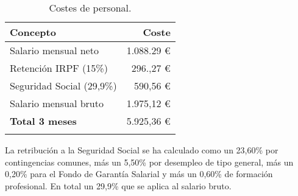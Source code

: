 \begin{longtable}[]{@{}lr@{}}
\toprule
\begin{minipage}[b]{0.38\columnwidth}\raggedright\strut
\textbf{Concepto}\strut
\end{minipage} & \begin{minipage}[b]{0.20\columnwidth}\raggedright\strut
\textbf{Coste}\strut
\end{minipage}\tabularnewline
\midrule
\endhead
\begin{minipage}[t]{0.38\columnwidth}\raggedright\strut
Salario mensual neto\strut
\end{minipage} & \begin{minipage}[t]{0.20\columnwidth}\raggedright\strut
1.088.29 \euro{}\strut
\end{minipage}\tabularnewline
\begin{minipage}[t]{0.38\columnwidth}\raggedright\strut
Retención IRPF (15\%)\strut
\end{minipage} & \begin{minipage}[t]{0.20\columnwidth}\raggedright\strut
296.,27 \euro{}\strut
\end{minipage}\tabularnewline
\begin{minipage}[t]{0.38\columnwidth}\raggedright\strut
Seguridad Social (29,9\%)\strut
\end{minipage} & \begin{minipage}[t]{0.20\columnwidth}\raggedright\strut
590,56 \euro{}\strut
\end{minipage}\tabularnewline
\begin{minipage}[t]{0.38\columnwidth}\raggedright\strut
Salario mensual bruto\strut
\end{minipage} & \begin{minipage}[t]{0.20\columnwidth}\raggedright\strut
1.975,12 \euro{}\strut
\end{minipage}\tabularnewline
\midrule
\begin{minipage}[t]{0.38\columnwidth}\raggedright\strut
\textbf{Total 3 meses}\strut
\end{minipage} & \begin{minipage}[t]{0.20\columnwidth}\raggedright\strut
5.925,36 \euro{}\strut
\end{minipage}\tabularnewline
\bottomrule
\caption{Costes de personal.}
\end{longtable}

La retribución\cite{SEG} a la Seguridad Social se ha calculado como un 23,60\% por contingencias comunes, más un 5,50\% por desempleo de tipo general, más un 0,20\% para el Fondo de Garantía Salarial y más un 0,60\% de formación profesional. En total un 29,9\% que se aplica al salario bruto.

